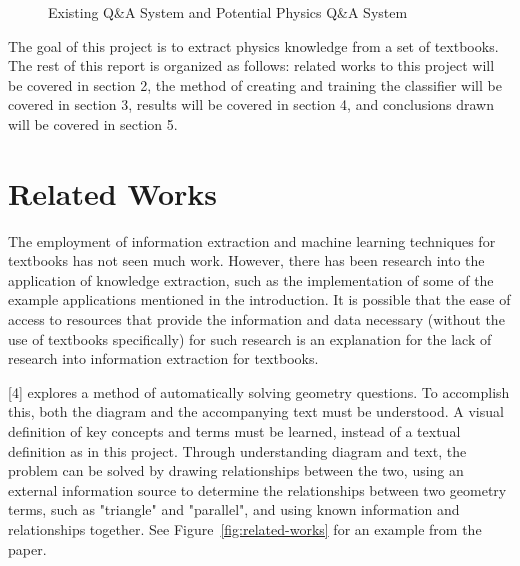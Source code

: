 \documentclass{article} %
\begin{document}
\begin{figure}[t]
\centering
{}
\caption{Existing Q\&A System and Potential Physics Q\&A System}
\label{fig:wolfram-alpha}
\end{figure}

The goal of this project is to extract physics knowledge from a set of textbooks.
The rest of this report is organized as follows: related works to this project will be covered in section 2, the method of creating and training the classifier will be covered in section 3, results will be covered in section 4, and conclusions drawn will be covered in section 5.

\section{Related Works}

The employment of information extraction and machine learning techniques for textbooks has not seen much work. However, there has been research into the application of knowledge extraction, such as the implementation of some of the example applications mentioned in the introduction. It is possible that the ease of access to resources that provide the information and data necessary (without the use of textbooks specifically) for such research is an explanation for the lack of research into information extraction for textbooks.

[4] explores a method of automatically solving geometry questions. To accomplish this, both the diagram and the accompanying text must be understood. A visual definition of key concepts and terms must be learned, instead of a textual definition as in this project. Through understanding diagram and text, the problem can be solved by drawing relationships between the two, using an external information source to determine the relationships between two geometry terms, such as "triangle" and "parallel", and using known information and relationships together. See Figure~\ref{fig:related-works} for an example from the paper.
\end{document}
